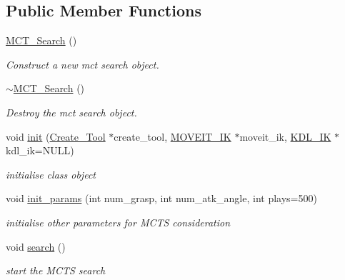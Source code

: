 \subsection*{Public Member Functions}
\begin{DoxyCompactItemize}
\item 
\mbox{\label{classMCT__Search_ad8edd41370fd1a382dc722e03f362d7c}} 
\hyperlink{classMCT__Search_ad8edd41370fd1a382dc722e03f362d7c}{M\+C\+T\+\_\+\+Search} ()
\begin{DoxyCompactList}\small\item\em Construct a new mct search object. \end{DoxyCompactList}\item 
\mbox{\label{classMCT__Search_a8eae1473dc5cc84c857f0cf26bfda769}} 
\hyperlink{classMCT__Search_a8eae1473dc5cc84c857f0cf26bfda769}{$\sim$\+M\+C\+T\+\_\+\+Search} ()
\begin{DoxyCompactList}\small\item\em Destroy the mct search object. \end{DoxyCompactList}\item 
void \hyperlink{classMCT__Search_a616c197a5427596143c0512a40373e8d}{init} (\hyperlink{classCreate__Tool}{Create\+\_\+\+Tool} $\ast$create\+\_\+tool, \hyperlink{classMOVEIT__IK}{M\+O\+V\+E\+I\+T\+\_\+\+IK} $\ast$moveit\+\_\+ik, \hyperlink{classKDL__IK}{K\+D\+L\+\_\+\+IK} $\ast$kdl\+\_\+ik=N\+U\+LL)
\begin{DoxyCompactList}\small\item\em initialise class object \end{DoxyCompactList}\item 
void \hyperlink{classMCT__Search_a42deaa445456fd8d1f286ab7c62f3714}{init\+\_\+params} (int num\+\_\+grasp, int num\+\_\+atk\+\_\+angle, int plays=500)
\begin{DoxyCompactList}\small\item\em initialise other parameters for M\+C\+TS consideration \end{DoxyCompactList}\item 
\mbox{\label{classMCT__Search_a908f154a160cadebf1c873425ffb0dee}} 
void \hyperlink{classMCT__Search_a908f154a160cadebf1c873425ffb0dee}{search} ()
\begin{DoxyCompactList}\small\item\em start the M\+C\+TS search \end{DoxyCompactList}\item 

\end{DoxyCompactItemize}
